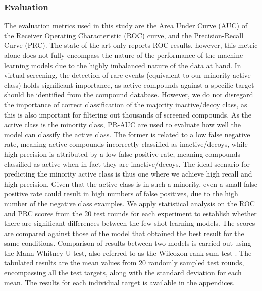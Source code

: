 \subsubsection{Evaluation}

The evaluation metrics used in this study are the Area Under Curve (AUC) of the Receiver Operating Characteristic (ROC) curve, and the Precision-Recall Curve (PRC). The state-of-the-art \cite{altae2017low} only reports ROC results, however, this metric alone does not fully encompass the nature of the performance of the machine learning models due to the highly imbalanced nature of the data at hand. In virtual screening, the detection of rare events (equivalent to our minority active class) holds significant importance, as active compounds against a specific target should be identified from the compound database. However, we do not disregard the importance of correct classification of the majority inactive/decoy class, as this is also important for filtering out thousands of screened compounds. As the active class is the minority class, PR-AUC are used to evaluate how well the model can classify the active class. The former is related to a low false negative rate, meaning active compounds incorrectly classified as inactive/decoys, while high precision is attributed by a low false positive rate, meaning compounds classified as active when in fact they are inactive/decoys. The ideal scenario for predicting the minority active class is thus one where we achieve high recall and high precision. Given that the active class is in such a minority, even a small false positive rate could result in high numbers of false positives, due to the high number of the negative class examples. We apply statistical analysis on the ROC and PRC scores from the 20 test rounds for each experiment to establish whether there are significant differences between the few-shot learning models. The scores are compared against those of the model that obtained the best result for the same conditions. Comparison of results between two models is carried out using the Mann-Whitney U-test, also referred to as the Wilcoxon rank sum test \citep{mann1947test}. The tabulated results are the mean values from 20 randomly sampled test rounds, encompassing all the test targets, along with the standard deviation for each mean. The results for each individual target is available in the appendices.
